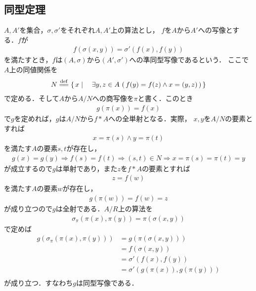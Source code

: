\subsection{同型定理}
	$A,A'$を集合，$\sigma,\sigma'$をそれぞれ$A,A'$上の算法とし，
	$f$を$A$から$A'$への写像とする．$f$が
	\begin{align}
		f(\sigma(x,y)) = \sigma'(f(x),f(y))
	\end{align}
	を満たすとき，$f$は$(A,\sigma)$から$(A',\sigma')$への準同型写像であるという．
	ここで$A$上の同値関係を
	\begin{align}
		N \defeq \Set{x}{\exists y,z \in A\, 
		\left(\, f(y) = f(z) \wedge x = (y,z)\, \right)}
	\end{align}
	で定める．そして$A$から$A/N$への商写像を$\pi$と書く．このとき
	\begin{align}
		g\left(\pi(x)\right) = f(x)
	\end{align}
	で$g$を定めれば，$g$は$A/N$から$f \ast A$への全単射となる．実際，
	$x,y$を$A/N$の要素とすれば
	\begin{align}
		x = \pi(s) \wedge y = \pi(t)
	\end{align}
	を満たす$A$の要素$s,t$が存在し，
	\begin{align}
		g(x) = g(y) \Longrightarrow f(s) = f(t)
		\Longrightarrow (s,t) \in N
		\Longrightarrow x = \pi(s) = \pi(t) = y
	\end{align}
	が成立するので$g$は単射であり，また$z$を$f \ast A$の要素とすれば
	\begin{align}
		z = f(w)
	\end{align}
	を満たす$A$の要素$w$が存在し，
	\begin{align}
		g(\pi(w)) = f(w) = z
	\end{align}
	が成り立つので$g$は全射である．$A/R$上の算法を
	\begin{align}
		\sigma_\pi(\pi(x),\pi(y)) = \pi(\sigma(x,y))
	\end{align}
	で定めば
	\begin{align}
		g \left( \sigma_\pi(\pi(x),\pi(y)) \right) 
		&= g \left( \pi(\sigma(x,y)) \right) \\
		&= f \left( \sigma(x,y) \right) \\
		&= \sigma'(f(x),f(y)) \\
		&= \sigma' \left( g(\pi(x)),g(\pi(y)) \right) \\
	\end{align}
	が成り立つ．すなわち$g$は同型写像である．
	
